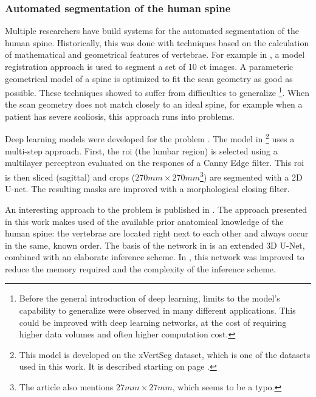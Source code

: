 \subsubsection{Automated segmentation of the human spine}
\par{
    Multiple researchers have build systems for the automated segmentation of the human spine.
    Historically, this was done with techniques based on the calculation of mathematical and geometrical features of vertebrae. 
    For example in \cite{Klinder2008}, a model registration approach is used to segment a set of 10 \acrshort{ct} images.
    A parameteric geometrical model of a spine is optimized to fit the scan geometry as good as possible.
    These techniques showed to suffer from difficulties to generalize
    \footnote{Before the general introduction of deep learning, limits to the model's capability to generalize were observed in many different applications.
    This could be improved with deep learning networks, at the cost of requiring higher data volumes and often higher computation cost.}. 
    When the scan geometry does not match closely to an ideal spine, for example when a patient has severe scoliosis, this approach runs into problems.
}
\par{
    Deep learning models were developed for the problem \cite{Sekuboyina2017, Janssens, Chuang2019, Lessmann2018}.
    The model in \cite{Sekuboyina2017}\footnote{This model is developed on the xVertSeg dataset, which is one of the datasets used in this work. It is described starting on page \pageref{sec:xVertSeg}.} 
    uses a multi-step approach. First, the \acrfull{roi} (the lumbar region) is selected using a multilayer perceptron evaluated on the respones of a Canny Edge filter.
    This \acrshort{roi} is then sliced (sagittal) and crops ($270mm \times 270mm$\footnote{The article also mentions $27mm \times 27mm$, which seems to be a typo.}) are segmented with a 2D U-net. 
    The resulting masks are improved with a morphological closing filter. 
}
\par{
    An interesting approach to the problem is published in \cite{Lessmann2018, Chuang2019}. 
    The approach presented in this work makes used of the available prior anatomical knowledge of the human spine: 
    the vertebrae are located right next to each other and always occur in the same, known order.  
    The basis of the network in \cite{Lessmann2018} is an extended 3D U-Net, combined with an elaborate inference scheme.
    In \cite{Chuang2019}, this network was improved to reduce the memory required and the complexity of the inference scheme.
}
